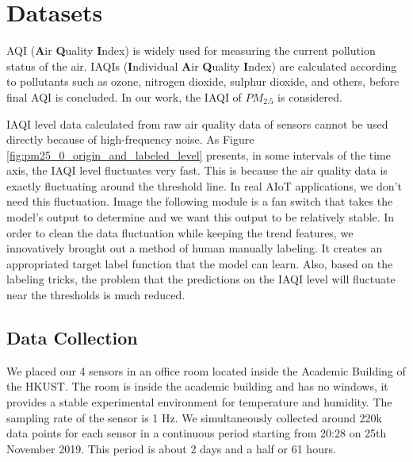 \documentclass[
twocolumn,
]{ceurart}
\begin{document}

\section{Datasets}\label{sec:data_modeling}

AQI (\textbf{A}ir \textbf{Q}uality \textbf{I}ndex) is widely used for measuring the current pollution status of the air. IAQIs (\textbf{I}ndividual \textbf{A}ir \textbf{Q}uality \textbf{I}ndex) are calculated according to pollutants such as ozone, nitrogen dioxide, sulphur dioxide, and others, before final AQI is concluded. In our work, the IAQI of $PM_{2.5}$ is considered.

IAQI level data calculated from raw air quality data of sensors cannot be used directly because of high-frequency noise. As Figure \ref{fig:pm25_0_origin_and_labeled_level} presents, in some intervals of the time axis, the IAQI level fluctuates very fast. This is because the air quality data is exactly fluctuating around the threshold line. In real AIoT applications, we don't need this fluctuation. Image the following module is a fan switch that takes the model's output to determine and we want this output to be relatively stable. In order to clean the data fluctuation while keeping the trend features, we innovatively brought out a method of human manually labeling. It creates an appropriated target label function that the model can learn. Also, based on the labeling tricks, the problem that the predictions on the IAQI level will fluctuate near the thresholds is much reduced.

\subsection{Data Collection}

We placed our 4 sensors in an office room located inside the Academic Building of the HKUST. The room is inside the academic building and has no windows, it provides a stable experimental environment for temperature and humidity. The sampling rate of the sensor is 1 Hz. We simultaneously collected around 220k data points for each sensor in a continuous period starting from 20:28 on 25th November 2019. This period is about 2 days and a half or 61 hours.
\end{document}
